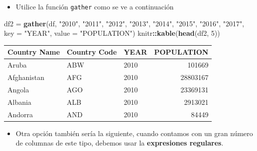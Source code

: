 \documentclass[
]{book}
\newenvironment{Shaded}{\begin{snugshade}}{\end{snugshade}}
\newcommand{\AttributeTok}[1]{\textcolor[rgb]{0.13,0.29,0.53}{#1}}
\newcommand{\DecValTok}[1]{\textcolor[rgb]{0.00,0.00,0.81}{#1}}
\newcommand{\FunctionTok}[1]{\textcolor[rgb]{0.13,0.29,0.53}{\textbf{#1}}}
\newcommand{\NormalTok}[1]{#1}
\newcommand{\OtherTok}[1]{\textcolor[rgb]{0.56,0.35,0.01}{#1}}
\newcommand{\SpecialCharTok}[1]{\textcolor[rgb]{0.81,0.36,0.00}{\textbf{#1}}}
\newcommand{\StringTok}[1]{\textcolor[rgb]{0.31,0.60,0.02}{#1}}
\providecommand{\tightlist}{%
  \setlength{\itemsep}{0pt}\setlength{\parskip}{0pt}}
\begin{document}
\begin{itemize}
\tightlist
\item
  Utilice la función \texttt{gather} como se ve a continuación
\end{itemize}

\begin{Shaded}
\begin{Highlighting}[]
\NormalTok{df2 }\OtherTok{=} \FunctionTok{gather}\NormalTok{(df, }
                \StringTok{"2010"}\NormalTok{, }\StringTok{"2011"}\NormalTok{, }\StringTok{"2012"}\NormalTok{, }\StringTok{"2013"}\NormalTok{, }\StringTok{"2014"}\NormalTok{, }\StringTok{"2015"}\NormalTok{, }\StringTok{"2016"}\NormalTok{, }\StringTok{"2017"}\NormalTok{, }
                \AttributeTok{key =} \StringTok{"YEAR"}\NormalTok{, }
                \AttributeTok{value =} \StringTok{"POPULATION"}\NormalTok{)}
\NormalTok{knitr}\SpecialCharTok{::}\FunctionTok{kable}\NormalTok{(}\FunctionTok{head}\NormalTok{(df2, }\DecValTok{5}\NormalTok{))}
\end{Highlighting}
\end{Shaded}

\begin{tabular}{l|l|l|r}
\hline
Country Name & Country Code & YEAR & POPULATION\\
\hline
Aruba & ABW & 2010 & 101669\\
\hline
Afghanistan & AFG & 2010 & 28803167\\
\hline
Angola & AGO & 2010 & 23369131\\
\hline
Albania & ALB & 2010 & 2913021\\
\hline
Andorra & AND & 2010 & 84449\\
\hline
\end{tabular}

\begin{itemize}
\tightlist
\item
  Otra opción también sería la siguiente, cuando contamos con un gran número de columnas de este tipo, debemos usar la \textbf{expresiones regulares}.
\end{itemize}

\begin{Shaded}
\end{Shaded}
\end{document}
